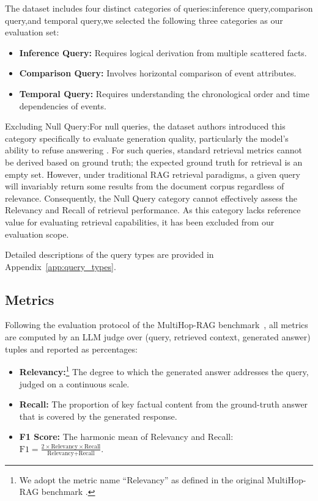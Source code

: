 \documentclass[11pt]{article}
\begin{document}
The dataset includes four distinct categories of queries:inference query,comparison query,and temporal query,we selected the following three categories as our evaluation set:
\begin{itemize}
    \item \textbf{Inference Query:} Requires logical derivation from multiple scattered facts.
    \item \textbf{Comparison Query:} Involves horizontal comparison of event attributes.
    \item \textbf{Temporal Query:} Requires understanding the chronological order and time dependencies of events.
\end{itemize}

Excluding Null Query:For null queries, the dataset authors introduced this category specifically to evaluate generation quality, particularly the model's ability to refuse answering \citep{17}. For such queries, standard retrieval metrics cannot be derived based on ground truth; the expected ground truth for retrieval is an empty set. However, under traditional RAG retrieval paradigms, a given query will invariably return some results from the document corpus regardless of relevance. Consequently, the Null Query category cannot effectively assess the Relevancy and Recall of retrieval performance. As this category lacks reference value for evaluating retrieval capabilities, it has been excluded from our evaluation scope.

Detailed descriptions of the query types are provided in Appendix~\ref{app:query_types}.

\subsection{Metrics}

Following the evaluation protocol of the MultiHop-RAG benchmark~\citep{17}, all metrics are computed by an LLM judge over (query, retrieved context, generated answer) tuples and reported as percentages:

\begin{itemize}
    \item \textbf{Relevancy:}\footnote{We adopt the metric name ``Relevancy'' as defined in the original MultiHop-RAG benchmark \citep{17}.} The degree to which the generated answer addresses the query, judged on a continuous scale.

    \item \textbf{Recall:} The proportion of key factual content from the ground-truth answer that is covered by the generated response.

    \item \textbf{F1 Score:} The harmonic mean of Relevancy and Recall: $\text{F1} = \frac{2 \times \text{Relevancy} \times \text{Recall}}{\text{Relevancy} + \text{Recall}}$.
\end{itemize}
\end{document}
